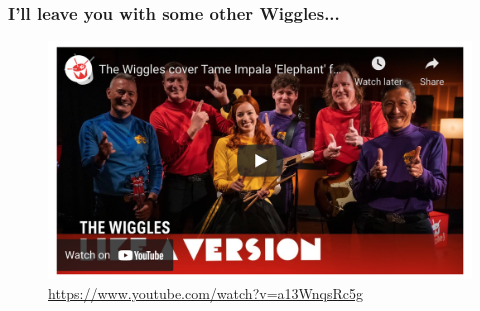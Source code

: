\documentclass{beamer}
\begin{document}
\begin{frame}
\frametitle{I'll leave you with some other Wiggles...}

\begin{figure}
\includegraphics[scale=.4]{figures/wiggles}
\caption{\url{https://www.youtube.com/watch?v=a13WnqsRc5g }}
\end{figure}

\end{frame}


\end{document}
